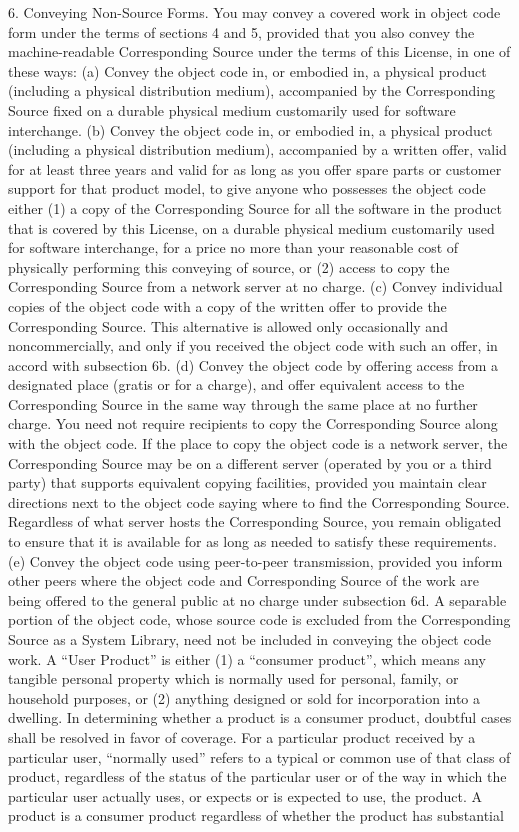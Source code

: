 \documentclass {scrbook}
\begin{document}
\begin{tiny}
6. Conveying Non-Source Forms. You may convey a covered work in object code form under the terms of sections 4 and 5, provided that you also convey the machine-readable Corresponding Source under the terms of this License, in one of these ways: (a) Convey the object code in, or embodied in, a physical product (including a physical distribution medium), accompanied by the Corresponding Source fixed on a durable physical medium customarily used for software interchange. (b) Convey the object code in, or embodied in, a physical product (including a physical distribution medium), accompanied by a written offer, valid for at least three years and valid for as long as you offer spare parts or customer support for that product model, to give anyone who possesses the object code either (1) a copy of the Corresponding Source for all the software in the product that is covered by this License, on a durable physical medium customarily used for software interchange, for a price no more than your reasonable cost of physically performing this conveying of source, or (2) access to copy the Corresponding Source from a network server at no charge. (c) Convey individual copies of the object code with a copy of the written offer to provide the Corresponding Source. This alternative is allowed only occasionally and noncommercially, and only if you received the object code with such an offer, in accord with subsection 6b. (d) Convey the object code by offering access from a designated place (gratis or for a charge), and offer equivalent access to the Corresponding Source in the same way through the same place at no further charge. You need not require recipients to copy the Corresponding Source along with the object code. If the place to copy the object code is a network server, the Corresponding Source may be on a different server (operated by you or a third party) that supports equivalent copying facilities, provided you maintain clear directions next to the object code saying where to find the Corresponding Source. Regardless of what server hosts the Corresponding Source, you remain obligated to ensure that it is available for as long as needed to satisfy these requirements. (e) Convey the object code using peer-to-peer transmission, provided you inform other peers where the object code and Corresponding Source of the work are being offered to the general public at no charge under subsection 6d. A separable portion of the object code, whose source code is excluded from the Corresponding Source as a System Library, need not be included in conveying the object code work. A ``User Product'' is either (1) a ``consumer product'', which means any tangible personal property which is normally used for personal, family, or household purposes, or (2) anything designed or sold for incorporation into a dwelling. In determining whether a product is a consumer product, doubtful cases shall be resolved in favor of coverage. For a particular product received by a particular user, ``normally used'' refers to a typical or common use of that class of product, regardless of the status of the particular user or of the way in which the particular user actually uses, or expects or is expected to use, the product. A product is a consumer product regardless of whether the product has substantial 
\end{tiny}
\end{document}
